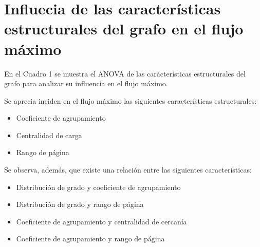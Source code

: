 \documentclass{article}
\begin{document}
\section*{Influecia de las características estructurales del grafo en el flujo máximo}

En el Cuadro 1 se muestra el ANOVA de las carácterísticas estructurales del grafo para analizar su influencia en el flujo máximo.

Se aprecia inciden en el flujo máximo las siguientes características estructurales:  

\begin{itemize}
\item Coeficiente de agrupamiento 
\item Centralidad de carga
\item Rango de página 
\end{itemize}

Se observa, además, que existe una relación entre las siguientes características:

\begin{itemize}
\item Distribución de grado y coeficiente de agrupamiento 
\item Distribución de grado y rango de página
\item Coeficiente de agrupamiento y centralidad de cercanía
\item Coeficiente de agrupamiento y rango de página

\end{itemize}
\end{document}
